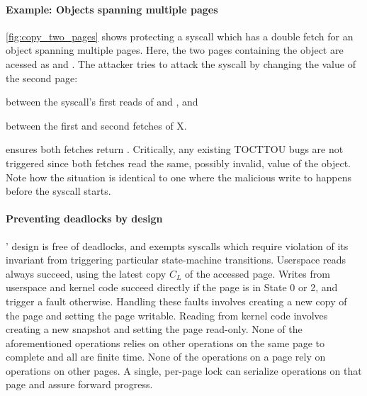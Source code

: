 \documentclass[letterpaper,twocolumn,10pt]{article}
\begin{document}
\paragraph{Example: Objects spanning multiple pages}
\autoref{fig:copy_two_pages} shows \midas protecting a syscall which
has a double fetch for an object spanning multiple pages.
Here, the two pages containing the object  are acessed as
 and .
The attacker tries to attack the syscall by changing the value of the
second page:
\begin{inparaenum}
\item between the syscall's first reads of  and , and
\item between the first and second fetches of X.
\end{inparaenum}
\midas ensures both fetches return .
Critically, any existing TOCTTOU bugs are not triggered since both fetches
read the same, possibly invalid, value of the object.
Note how the situation is identical to one where the malicious write
to  happens before the syscall starts.

\paragraph{Preventing deadlocks by design}
\midas' design is free of deadlocks, and exempts syscalls which
require violation of its invariant from triggering particular
state-machine transitions.
Userspace reads always succeed, using the latest copy $C_L$ of the
accessed page.
Writes from userspace and kernel code succeed directly if the
page is in State 0 or 2, and trigger a fault otherwise.
Handling these faults involves creating a new copy of the page and
setting the page writable.
Reading from kernel code involves creating a new snapshot and
setting the page read-only.
None of the aforementioned operations relies on other operations
on the same page to complete and all are finite time.
None of the operations on a page rely on operations on other pages.
A single, per-page lock can serialize operations on that page
and assure forward progress.
\end{document}

